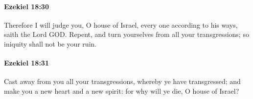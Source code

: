 		\paragraph{Ezekiel 18:30} %
			\label{EZEKIEL-18-30}

			Therefore I will judge you, O house of Israel, every one according to his ways, saith the Lord GOD. Repent, and turn yourselves from all your transgressions; so iniquity shall not be your ruin.


		\paragraph{Ezekiel 18:31} %
			\label{EZEKIEL-18-31}

			Cast away from you all your transgressions, whereby ye have transgressed; and make you a new heart and a new spirit: for why will ye die, O house of Israel?


